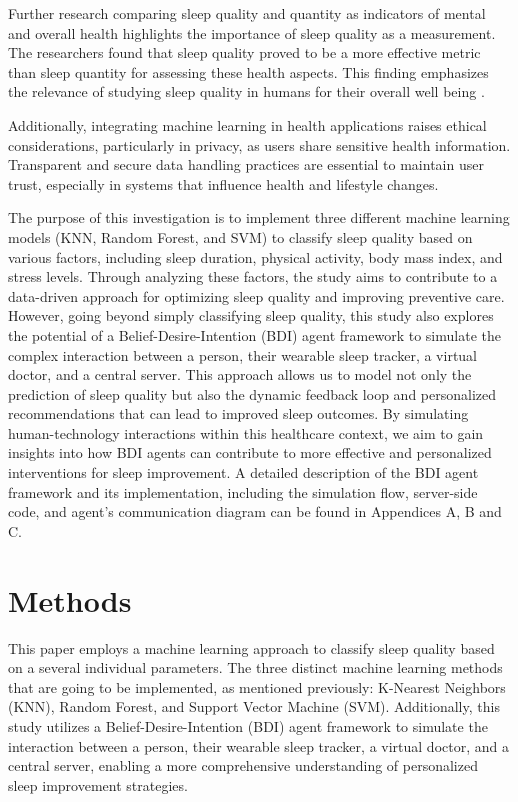 \documentclass[conference]{IEEEtran}
\begin{document}
Further research comparing sleep quality and quantity as indicators of mental and overall health highlights the importance of sleep quality as a measurement. The researchers found that sleep quality proved to be a more effective metric than sleep quantity for assessing these health aspects. This finding emphasizes the relevance of studying sleep quality in humans for their overall well being \cite{Kohyama2021}.

Additionally, integrating machine learning in health applications raises ethical considerations, particularly in privacy, as users share sensitive health information. Transparent and secure data handling practices are essential to maintain user trust, especially in systems that influence health and lifestyle changes.

The purpose of this investigation is to implement three different machine learning models (KNN, Random Forest, and SVM) to classify sleep quality based on various factors, including sleep duration, physical activity, body mass index, and stress levels. Through analyzing these factors, the study aims to contribute to a data-driven approach for optimizing sleep quality and improving preventive care. However, going beyond simply classifying sleep quality, this study also explores the potential of a Belief-Desire-Intention (BDI) agent framework to simulate the complex interaction between a person, their wearable sleep tracker, a virtual doctor, and a central server. This approach allows us to model not only the prediction of sleep quality but also the dynamic feedback loop and personalized recommendations that can lead to improved sleep outcomes. By simulating human-technology interactions within this healthcare context, we aim to gain insights into how BDI agents can contribute to more effective and personalized interventions for sleep improvement. A detailed description of the BDI agent framework and its implementation, including the simulation flow, server-side code, and agent's communication diagram can be found in Appendices A, B and C.

\section{Methods}
This paper employs a machine learning approach to classify sleep quality based on a several individual parameters. The three distinct machine learning methods that are going to be implemented, as mentioned previously: K-Nearest Neighbors (KNN), Random Forest, and Support Vector Machine (SVM).  Additionally, this study utilizes a Belief-Desire-Intention (BDI) agent framework to simulate the interaction between a person, their wearable sleep tracker, a virtual doctor, and a central server, enabling a more comprehensive understanding of personalized sleep improvement strategies.
\end{document}
